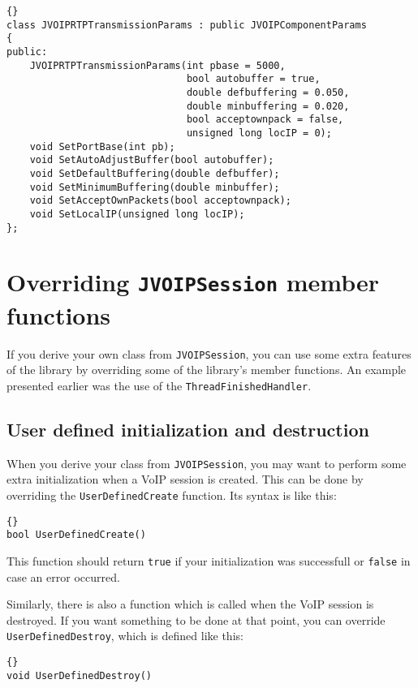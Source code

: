 		
		\begin{lstlisting}[frame=tb]{}
class JVOIPRTPTransmissionParams : public JVOIPComponentParams
{
public:
	JVOIPRTPTransmissionParams(int pbase = 5000,
	                           bool autobuffer = true,
	                           double defbuffering = 0.050,
	                           double minbuffering = 0.020,
	                           bool acceptownpack = false,
	                           unsigned long locIP = 0);
	void SetPortBase(int pb);
	void SetAutoAdjustBuffer(bool autobuffer);
	void SetDefaultBuffering(double defbuffer);
	void SetMinimumBuffering(double minbuffer);
	void SetAcceptOwnPackets(bool acceptownpack);
	void SetLocalIP(unsigned long locIP);
};
		\end{lstlisting}
	
	\section{Overriding {\tt JVOIPSession} member functions}
	
	If you derive your own class from {\tt JVOIP\-Session}, you can use some
	extra features of the library by overriding some of the library's
	member functions. An example presented earlier was the use of the 
	{\tt ThreadFinishedHandler}.
	
		\subsection{User defined initialization and destruction}
		
		When you derive your class from {\tt JVOIP\-Session}, you may want to
		perform some extra initialization when a VoIP session is created.
		This can be done by overriding the {\tt UserDefinedCreate} function.
		Its syntax is like this:
		\begin{lstlisting}[frame=tb]{}
bool UserDefinedCreate()
		\end{lstlisting}
		This function should return {\tt true} if your initialization was
		successfull or {\tt false} in case an error occurred.
		
		Similarly, there is also a function which is called when the VoIP
		session is destroyed. If you want something to be done at that point,
		you can override {\tt UserDefinedDestroy}, which is defined like
		this:
		\begin{lstlisting}[frame=tb]{}
void UserDefinedDestroy()
		\end{lstlisting}
		
